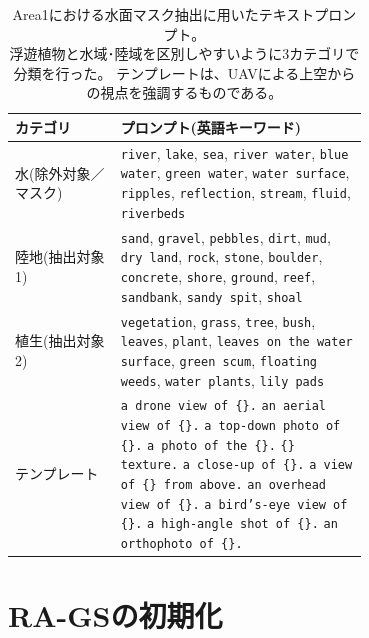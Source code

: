 \begin{table}[htbp]
  \centering
  \caption{
    Area1における水面マスク抽出に用いたテキストプロンプト。\\
    浮遊植物と水域･陸域を区別しやすいように3カテゴリで分類を行った。
    テンプレートは、UAVによる上空からの視点を強調するものである。
  }
  \label{tab:prompts}
  \begin{tabular}{lp{0.7\linewidth}}
    \hline
    カテゴリ & プロンプト(英語キーワード) \\
    \hline
    水(除外対象／マスク) &
      \texttt{river}, \texttt{lake}, \texttt{sea},
      \texttt{river water},
      \texttt{blue water},
      \texttt{green water},
      \texttt{water surface},
      \texttt{ripples},
      \texttt{reflection},
      \texttt{stream},
      \texttt{fluid},
      \texttt{riverbeds} \\
    \hline
    陸地(抽出対象1) &
      \texttt{sand},
      \texttt{gravel},
      \texttt{pebbles},
      \texttt{dirt},
      \texttt{mud},
      \texttt{dry land},
      \texttt{rock}, \texttt{stone},
      \texttt{boulder},
      \texttt{concrete},
      \texttt{shore},
      \texttt{ground},
      \texttt{reef},
      \texttt{sandbank},
      \texttt{sandy spit},
      \texttt{shoal} \\
    \hline
    植生(抽出対象2) &
      \texttt{vegetation},
      \texttt{grass},
      \texttt{tree}, \texttt{bush},
      \texttt{leaves},
      \texttt{plant},
      \texttt{leaves on the water surface},
      \texttt{green scum},
      \texttt{floating weeds},
      \texttt{water plants},
      \texttt{lily pads} \\
    \hline
    テンプレート & 
      \texttt{a drone view of \{\}.}
      \texttt{an aerial view of \{\}.}
      \texttt{a top-down photo of \{\}.}
      \texttt{a photo of the \{\}.}
      \texttt{\{\} texture.}
      \texttt{a close-up of \{\}.}
      \texttt{a view of \{\} from above.}
      \texttt{an overhead view of \{\}.}
      \texttt{a bird's-eye view of \{\}.}
      \texttt{a high-angle shot of \{\}.} 
      \texttt{an orthophoto of \{\}.} \\
    \hline
  \end{tabular}
\end{table}


\newpage

\section{RA-GSの初期化}\label{sec:initialization-of-gaussians}

